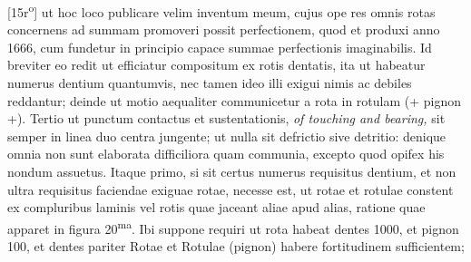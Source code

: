 [15r\textsuperscript{o}] ut hoc loco publicare velim inventum meum, cujus ope res omnis rotas concernens ad summam promoveri possit perfectionem, quod et produxi anno 1666, cum fundetur in principio capace summae perfectionis imaginabilis. Id breviter eo redit ut efficiatur compositum ex rotis dentatis, ita ut habeatur numerus dentium quantumvis, nec tamen ideo illi exigui nimis ac debiles reddantur; deinde ut motio aequaliter communicetur a rota in rotulam (+ pignon +). Tertio ut punctum contactus et sustentationis, \textit{of touching and bearing,} sit semper in linea duo centra jungente;  ut nulla sit defrictio sive detritio: denique omnia non sunt elaborata difficiliora quam communia, excepto quod opifex his nondum assuetus. Itaque primo, si sit certus numerus requisitus dentium, 
et non ultra requisitus faciendae exiguae rotae, necesse est, ut rotae et rotulae constent ex compluribus laminis vel rotis quae jaceant aliae apud alias, ratione quae apparet in figura 20\textsuperscript{ma}. Ibi suppone requiri ut rota habeat dentes 1000, et pignon 100, 
et dentes pariter Rotae et Rotulae (pignon) habere fortitudinem sufficientem;
\pend
\newpage
\pstart \noindent 
